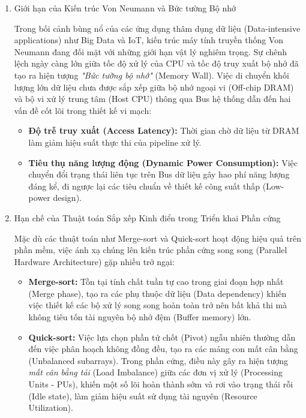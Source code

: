 \begin{enumerate}[label=\alph*.]
	\item Giới hạn của Kiến trúc Von Neumann và Bức tường Bộ nhớ
	
	Trong bối cảnh bùng nổ của các ứng dụng thâm dụng dữ liệu (Data-intensive applications) như Big Data và IoT, kiến trúc máy tính truyền thống Von Neumann đang đối mặt với những giới hạn vật lý nghiêm trọng. Sự chênh lệch ngày càng lớn giữa tốc độ xử lý của CPU và tốc độ truy xuất bộ nhớ đã tạo ra hiện tượng \textit{"Bức tường bộ nhớ"} (Memory Wall). Việc di chuyển khối lượng lớn dữ liệu chưa được sắp xếp giữa bộ nhớ ngoại vi (Off-chip DRAM) và bộ vi xử lý trung tâm (Host CPU) thông qua Bus hệ thống dẫn đến hai vấn đề cốt lõi trong thiết kế vi mạch:
	\begin{itemize}
		\item \textbf{Độ trễ truy xuất (Access Latency):} Thời gian chờ dữ liệu từ DRAM làm giảm hiệu suất thực thi của pipeline xử lý.
		\item \textbf{Tiêu thụ năng lượng động (Dynamic Power Consumption):} Việc chuyển đổi trạng thái liên tục trên Bus dữ liệu gây hao phí năng lượng đáng kể, đi ngược lại các tiêu chuẩn về thiết kế công suất thấp (Low-power design).
	\end{itemize}
	
	\item Hạn chế của Thuật toán Sắp xếp Kinh điển trong Triển khai Phần cứng
	
	Mặc dù các thuật toán như Merge-sort và Quick-sort hoạt động hiệu quả trên phần mềm, việc ánh xạ chúng lên kiến trúc phần cứng song song (Parallel Hardware Architecture) gặp nhiều trở ngại:
	\begin{itemize}
		\item \textbf{Merge-sort:} Tồn tại tính chất tuần tự cao trong giai đoạn hợp nhất (Merge phase), tạo ra các phụ thuộc dữ liệu (Data dependency) khiến việc thiết kế các bộ xử lý song song hoàn toàn trở nên bất khả thi mà không tiêu tốn tài nguyên bộ nhớ đệm (Buffer memory) lớn.
		\item \textbf{Quick-sort:} Việc lựa chọn phần tử chốt (Pivot) ngẫu nhiên thường dẫn đến việc phân hoạch không đồng đều, tạo ra các mảng con mất cân bằng (Unbalanced subarrays). Trong phần cứng, điều này gây ra hiện tượng \textit{mất cân bằng tải} (Load Imbalance) giữa các đơn vị xử lý (Processing Units - PUs), khiến một số lõi hoàn thành sớm và rơi vào trạng thái rỗi (Idle state), làm giảm hiệu suất sử dụng tài nguyên (Resource Utilization).
	\end{itemize}
\end{enumerate}

